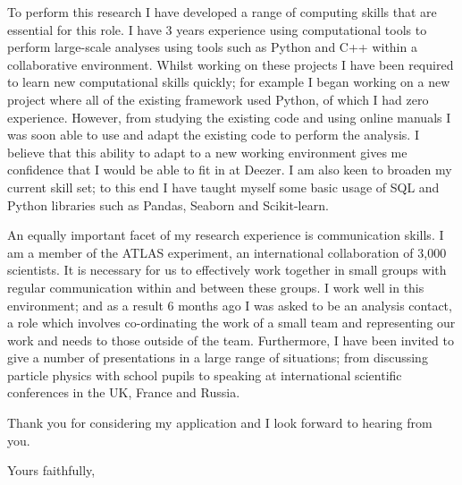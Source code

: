 \documentclass[]{letter}
\begin{document}
\begin{letter}{}
To perform this research I have developed a range of computing skills that are essential for this role.
I have 3 years experience using computational tools to perform large-scale analyses using tools such as
Python and C++ within a collaborative environment.
Whilst working on these projects I have been required to learn new computational skills quickly;
for example I began working on a new project where all of the existing framework used Python,
of which I had zero experience.
However, from studying the existing code and using online manuals
I was soon able to use and adapt the existing code to perform the analysis.
I believe that this ability to adapt to a new working environment gives me confidence that I would be able to fit in at Deezer.
I am also keen to broaden my current skill set;
to this end I have taught myself some basic usage of SQL and Python libraries such as Pandas, Seaborn and Scikit-learn.


An equally important facet of my research experience is communication skills.
I am a member of the ATLAS experiment, an international collaboration of 3,000 scientists.
It is necessary for us to effectively work together in small groups
with regular communication within and between these groups.
I work well in this environment;
and as a result 6 months ago I was asked to be an analysis contact,
a role which involves co-ordinating the work of a small team and representing our work and needs to those outside of the team.
Furthermore, I have been invited to give a number of presentations in a large range of situations;
from discussing particle physics with school pupils to speaking at international scientific conferences in the UK, France and Russia.



\vspace{1mm}

Thank you for considering my application and I look forward to hearing from you.

\vspace{3mm}

\closing{Yours faithfully,}


\end{letter}
\end{document}
